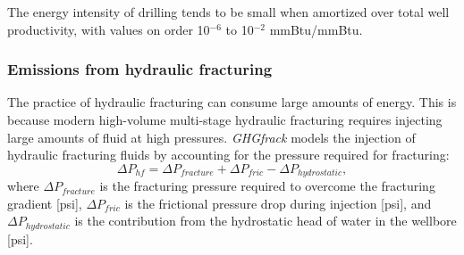 \documentclass[11pt]{report}
\begin{document}
The energy intensity of drilling tends to be small when amortized over total well productivity, with values on order 10$^{-6}$ to 10$^{-2}$ mmBtu/mmBtu.

\subsubsection{Emissions from hydraulic fracturing}

The practice of hydraulic fracturing can consume large amounts of energy. This is because modern high-volume multi-stage hydraulic fracturing requires injecting large amounts of fluid at high pressures.  \emph{GHGfrack} models the injection of hydraulic fracturing fluids by accounting for the pressure required for fracturing:
\begin{equation}
\Delta P_{hf} = \Delta P_{fracture} + \Delta P_{fric} - \Delta P_{hydrostatic},
\end{equation}
where $\Delta P_{fracture}$ is the fracturing pressure required to overcome the fracturing gradient [psi], $ \Delta P_{fric}$ is the frictional pressure drop during injection [psi], and $\Delta P_{hydrostatic}$ is the contribution from the hydrostatic head of water in the wellbore [psi].
\end{document}
